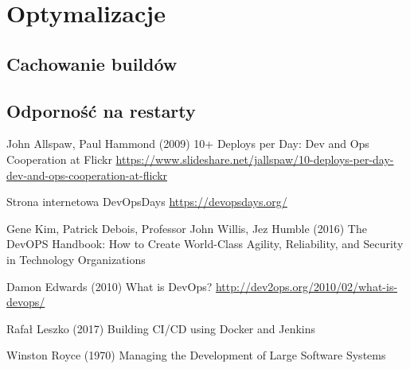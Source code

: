\documentclass{article}
\begin{document}
\section{Optymalizacje}
\subsection{Cachowanie buildów}
\subsection{Odporność na restarty}



\begin{thebibliography}{9}

John Allspaw, Paul Hammond (2009) 10+ Deploys per Day: Dev and Ops Cooperation at Flickr \url{https://www.slideshare.net/jallspaw/10-deploys-per-day-dev-and-ops-cooperation-at-flickr}

Strona internetowa DevOpsDays \url{https://devopsdays.org/}

Gene Kim, Patrick Debois, Professor John Willis, Jez Humble (2016) The DevOPS Handbook: How to Create World-Class Agility, Reliability, and Security in Technology Organizations

Damon Edwards (2010) What is DevOps? \url{http://dev2ops.org/2010/02/what-is-devops/}

Rafał Leszko (2017) Building CI/CD using Docker and Jenkins

Winston Royce (1970) Managing the Development of Large Software Systems

\end{thebibliography}
\end{document}
